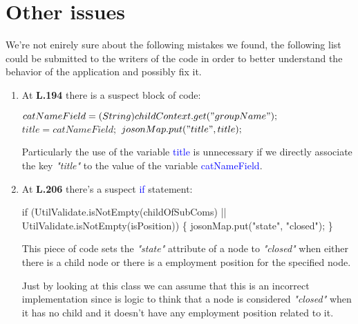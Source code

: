 \section{Other issues}

We're not enirely sure about the following mistakes we found, the following list
could be submitted to the writers of the code in order to better understand the
behavior of the application and possibly fix it.

\begin{enumerate}

	\item At \textbf{L.194} there is a suspect block of code:
		\begin{algorithm}
		\begin{algorithmic}[1]
		\setcounter{ALG@line}{193}

			\State $ catNameField = (String) childContext.get("groupName"); $
			\State $ title = catNameField; $
			\State $ josonMap.put("title",title); $

		\end{algorithmic}
		\end{algorithm}

		Particularly the use of the variable \textcolor{blue}{title} is unnecessary if
		we directly associate the key \textit{"title"} to the value of the variable
		\textcolor{blue}{catNameField}.

\item At \textbf{L.206} there's a suspect \textcolor{blue}{if} statement:

	\begin{algorithm}
	\begin{algorithmic}[1]
	\setcounter{ALG@line}{205}

		\State  if (UtilValidate.isNotEmpty(childOfSubComs) ||
		\State\hspace{13em}  UtilValidate.isNotEmpty(isPosition)) \{
		\State\hspace{0.5em}  josonMap.put("state", "closed");
		\State  \}

	\end{algorithmic}
	\end{algorithm}

	This piece of code sets the \textit{"state"} attribute of a node to
	\textit{"closed"} when either there is a child node or there is a employment
	position for the specified node.

	Just by looking at this class we can assume that this is an incorrect
	implementation since is logic to think that a node is considered
	\textit{"closed"} when it has no child and it doesn't have any employment
	position related to it.

\end{enumerate}
